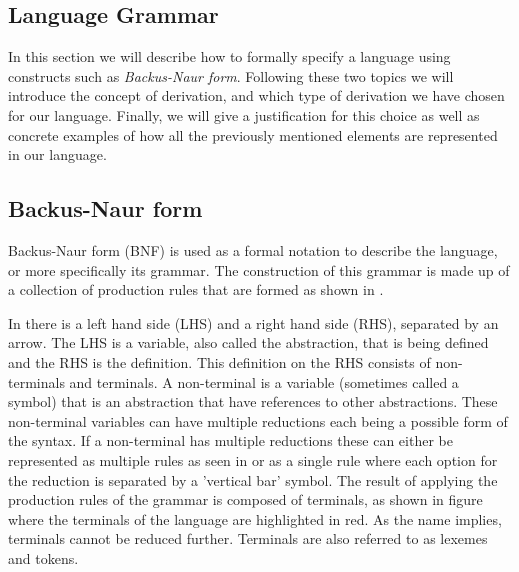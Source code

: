 \subsection{Language Grammar} \label{langGram}

In this section we will describe how to formally specify a language using constructs such as \textit{Backus-Naur form}.
Following these two topics we will introduce the concept of derivation, and which type of derivation we have chosen for our language.
Finally, we will give a justification for this choice as well as concrete examples of how all the previously mentioned elements are represented in our language.

\subsection{Backus-Naur form}

Backus-Naur form (BNF) is used as a formal notation to describe the language, or more specifically its grammar.
The construction of this grammar is made up of a collection of production rules that are formed as shown in .


In  there is a left hand side (LHS) and a right hand side (RHS), separated by an arrow. The LHS is a variable, also called the abstraction, that is being defined and the RHS is the definition.
This definition on the RHS consists of non-terminals and terminals. A non-terminal is a variable (sometimes called a symbol) that is an abstraction that have references to other abstractions.
These non-terminal variables can have multiple reductions each being a possible form of the syntax.
If a non-terminal has multiple reductions these can either be represented as multiple rules as seen in  or as a single rule where each option for the reduction is separated by a 'vertical bar' symbol.
The result of applying the production rules of the grammar is composed of terminals, as shown in figure  where the terminals of the language are highlighted in red.
As the name implies, terminals cannot be reduced further. Terminals are also referred to as lexemes and tokens\cite{sebesta_concepts_2016}.



